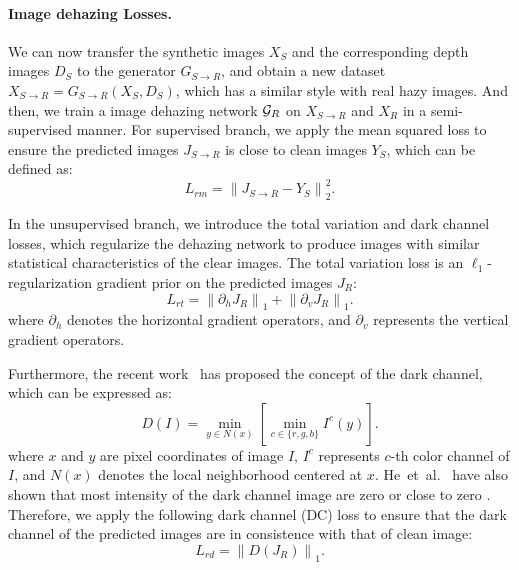 \documentclass[10pt,twocolumn,letterpaper]{article}
\def\etal{et~al.\xspace}
\begin{document}
\vspace{-5mm}
\paragraph{Image dehazing Losses.}
We can now transfer the synthetic images ${X_S}$ and the corresponding depth images ${D_S}$ to the generator ${G_{S \to R}}$, and obtain a new dataset ${X_{S \to R}} = {G_{S \to R}}({X_{S}},{D_{S}})$, which has a similar style with real hazy images. 
And then, we train a image dehazing network ${{\cal G}_R}$ on ${X_{S \to R}}$  and ${X_R}$ in a semi-supervised manner. 
For supervised branch, we apply the mean squared loss to ensure the predicted images ${{J_{S \to R}}}$ is close to clean images ${{Y_S}}$, which can be defined as:
\begin{equation}
\label{eqn:MSE_loss}
{L_{rm}} = \left\| {{J_{S \to R}} - {Y_S}} \right\|_2^2.
\end{equation}


In the unsupervised branch, we introduce the total variation and dark channel losses, which regularize the dehazing network to produce images with similar statistical characteristics of the clear images.
The total variation loss is an $\ell_1$-regularization gradient prior on the predicted images ${{J_R}}$: 
\begin{equation}
\label{eqn:TV_loss}
{L_{rt}} = {\left\| {{\partial _h}{J_R}} \right\|_1} + {\left\| {{\partial _v}{J_R}} \right\|_1}.
\end{equation}
where ${{\partial _h}}$ denotes the horizontal gradient operators, and ${{\partial _v}}$ represents the vertical gradient operators.

Furthermore, the recent work~\cite{He2011Single} has proposed the concept of the dark channel, which can be expressed as:
\begin{equation}
\label{eqn:DC}
D(I) = \mathop {\min }\limits_{y \in N(x)} \left[ {\mathop {\min }\limits_{c \in \{ r,g,b\} } {I^c}(y)} \right].
\end{equation}
where $x$ and $y$ are pixel coordinates of image $I$, $I^c$ represents $c$-th color channel of $I$, and $N(x)$ denotes the local neighborhood centered at $x$. 
He~\etal~\cite{He2011Single} have also shown that most intensity of the dark channel image are zero or close to zero .
Therefore, we apply the following dark channel (DC) loss to ensure that the dark channel of the predicted images are in consistence with that of clean image:
\begin{equation}
\label{eqn:DC_loss}
{L_{rd}} = {\left\| {D({J_R})} \right\|_1}.
\end{equation}
\end{document}
